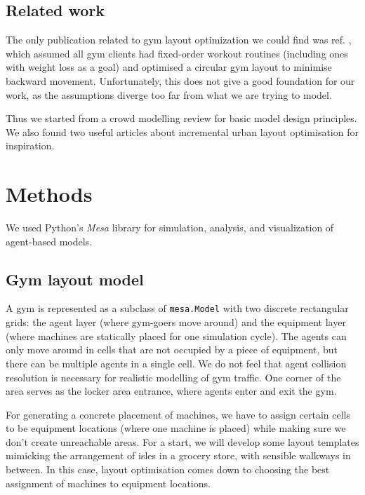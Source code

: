 \documentclass[9pt]{pnas-new}
\begin{document}
\subsection*{Related work}
The only publication related to gym layout optimization we could find was ref. \cite{turcine2022gym}, which assumed all gym clients had fixed-order workout routines (including ones with weight loss as a goal) and optimised a circular gym layout to minimise backward movement. Unfortunately, this does not give a good foundation for our work, as the assumptions diverge too far from what we are trying to model.

Thus we started from a crowd modelling review \cite{yang2020crowd_modelling_review} for basic model design principles. We also found two useful articles about incremental urban layout optimisation \cite{feng2016crowd_drive_layout_design, mathew2019urban_walkability} for inspiration.

\section*{Methods}

We used Python's {\it Mesa} library for simulation, analysis, and visualization of agent-based models.

\subsection*{Gym layout model}

A gym is represented as a subclass of \texttt{mesa.Model} with two discrete rectangular grids: the agent layer (where gym-goers move around) and the equipment layer (where machines are statically placed for one simulation cycle). The agents can only move around in cells that are not occupied by a piece of equipment, but there can be multiple agents in a single cell. We do not feel that agent collision resolution is necessary for realistic modelling of gym traffic. 
One corner of the area serves as the locker area entrance, where agents enter and exit the gym.

For generating a concrete placement of machines, we have to assign certain cells to be equipment locations (where one machine is placed) while making sure we don't create unreachable areas. For a start, we will develop some layout templates mimicking the arrangement of isles in a grocery store, with sensible walkways in between. In this case, layout optimisation comes down to choosing the best assignment of machines to equipment locations.
\end{document}
